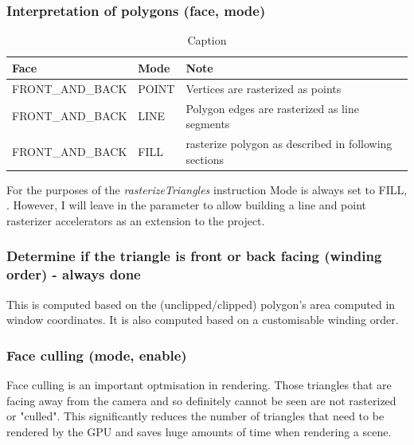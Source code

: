 \subsubsection{Interpretation of polygons (face, mode)}
\begin{table}[ht]
    \begin{tabular}{|l|l|l|}
    \hline
    Face             & Mode  & Note                                                 \\ \hline
    FRONT\_AND\_BACK & POINT & Vertices are rasterized as points                    \\ \hline
    FRONT\_AND\_BACK & LINE  & Polygon edges are rasterized as line segments        \\ \hline
    FRONT\_AND\_BACK & FILL  & rasterize polygon as described in following sections \\ \hline
    \end{tabular}
    \caption{Caption}
    \label{table:OpenGLrasterizerModes}
\end{table}
For the purposes of the \textit{rasterizeTriangles} instruction Mode is always set to FILL, . However, I will leave in the parameter to allow building a line and point rasterizer accelerators as an extension to the project.
\subsubsection{Determine if the triangle is front or back facing (winding order) - always done}
This is computed based on the (unclipped/clipped) polygon’s area computed in window coordinates. 
It is also computed based on a customisable winding order.

\subsubsection{Face culling (mode, enable)}
Face culling is an important optmisation in rendering. Those triangles that are facing away from the camera and so definitely cannot be seen are not rasterized or "culled". This significantly reduces the number of triangles that need to be rendered by the GPU and saves huge amounts of time when rendering a scene.

